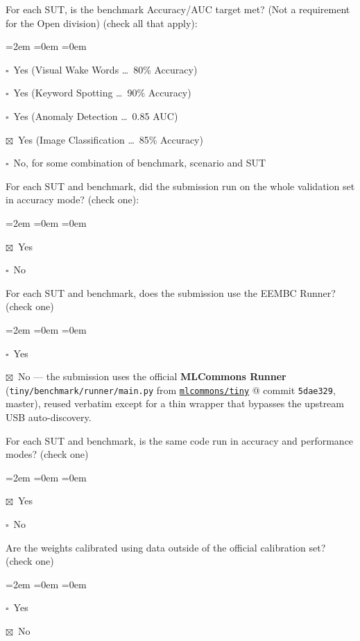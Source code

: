 \documentclass[11pt]{article}
\newcommand{\cb}{$\square$~}            %
\newcommand{\cbx}{$\boxtimes$~}         %
\begin{document}
\clearpage

For each SUT, is the benchmark Accuracy/AUC target met? (Not a requirement
for the Open division) (check all that apply):
\begin{list}{}{\leftmargin=2em \itemsep=0em \topsep=0em}
\item \cb  Yes (Visual Wake Words \dots\ 80\% Accuracy)
\item \cb  Yes (Keyword Spotting \dots\ 90\% Accuracy)
\item \cb  Yes (Anomaly Detection \dots\ 0.85 AUC)
\item \cbx Yes (Image Classification \dots\ 85\% Accuracy)
\item \cb  No, for some combination of benchmark, scenario and SUT
\end{list}

For each SUT and benchmark, did the submission run on the whole validation
set in accuracy mode? (check one):
\begin{list}{}{\leftmargin=2em \itemsep=0em \topsep=0em}
\item \cbx Yes
\item \cb  No
\end{list}

For each SUT and benchmark, does the submission use the EEMBC Runner?
(check one)
\begin{list}{}{\leftmargin=2em \itemsep=0em \topsep=0em}
\item \cb  Yes
\item \cbx No --- the submission uses the official \textbf{MLCommons Runner}
            (\texttt{tiny/benchmark/runner/main.py} from
            \href{https://github.com/mlcommons/tiny}{\texttt{mlcommons/tiny}}
            @ commit \texttt{5dae329}, master), reused verbatim except for a
            thin wrapper that bypasses the upstream USB auto-discovery.
\end{list}

For each SUT and benchmark, is the same code run in accuracy and
performance modes? (check one)
\begin{list}{}{\leftmargin=2em \itemsep=0em \topsep=0em}
\item \cbx Yes
\item \cb  No
\end{list}

Are the weights calibrated using data outside of the official calibration
set? (check one)
\begin{list}{}{\leftmargin=2em \itemsep=0em \topsep=0em}
\item \cb  Yes
\item \cbx No
\end{list}
\end{document}
